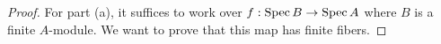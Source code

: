 \documentclass[]{pcmi}
\theoremstyle{plain}
\theoremstyle{definition}
\theoremstyle{remark}
\begin{document}
\begin{proof}
    For part (a), it suffices to work over $f : \operatorname{Spec} B \to \operatorname{Spec} A$ where $B$ is a finite $A$-module. We want to prove that this map has finite fibers. 
\end{proof}
%    
%
%
%
%             
%   
%
%  

\bibspread



\vfill\eject
\end{document}
